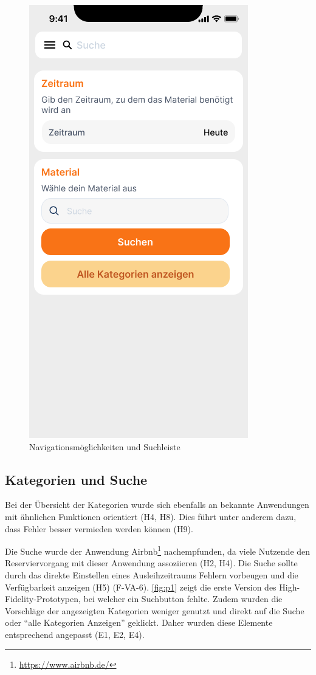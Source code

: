 \begin{figure}[h]
    \includegraphics[scale=0.3]{Bilder/Prototyp/Neu/Suche V2.png}
    \caption[-]{Navigationsmöglichkeiten und Suchleiste}
    \label{fig:nav}
\end{figure}

\subsection{Kategorien und Suche}
Bei der Übersicht der Kategorien wurde sich  ebenfalls an bekannte Anwendungen mit
ähnlichen Funktionen orientiert (H4, H8). Dies führt unter anderem dazu,
dass Fehler besser vermieden werden können (H9).

Die Suche wurde der Anwendung Airbnb\footnote{\url{https://www.airbnb.de/}}
nachempfunden, da viele Nutzende den Reserviervorgang mit dieser Anwendung
assoziieren (H2, H4). Die Suche sollte durch das direkte Einstellen eines
Ausleihzeitraums Fehlern vorbeugen und die Verfügbarkeit anzeigen (H5) (F-VA-6).
\ref{fig:p1} zeigt die erste Version des High-Fidelity-Prototypen, bei welcher
ein Suchbutton fehlte. Zudem wurden die Vorschläge der angezeigten Kategorien
weniger genutzt und direkt auf die Suche oder \enquote{alle Kategorien Anzeigen}
geklickt. Daher wurden diese Elemente entsprechend angepasst (E1, E2, E4).

